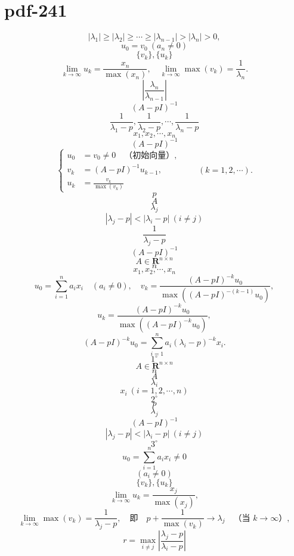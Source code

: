 \documentclass[fontset=fandol]{ctexart}
\begin{document}
\section*{pdf-241}
\[
|\lambda_1|\geq|\lambda_2|\geq\cdots\geq|\lambda_{n-1}|>|\lambda_n|>0,
\]
\[
u_0=v_0\ (a_n\ne0)
\]
\[
\{v_k\},\{u_k\}
\]
\[
\lim_{k\to\infty}u_k=\frac{x_n}{\max(x_n)},\quad\lim_{k\to\infty}\max(v_k)=\frac1{\lambda_n}.
\]
\[
\left|\dfrac{\lambda_n}{\lambda_{n-1}}\right|
\]
\[
(A-pI)^{-1}
\]
\[
\dfrac1{\lambda_1-p},\dfrac1{\lambda_2-p},\cdots,\dfrac1{\lambda_n-p}
\]
\[
x_1,x_2,\cdots,x_n
\]
\[
(A-pI)^{-1}
\]
\[
\left\{
\begin{aligned}
u_0&=v_0\ne0\quad\text{（初始向量）},\\
v_k&=(A-pI)^{-1}u_{k-1},\\
u_k&=\frac{v_k}{\max(v_k)}
\end{aligned}
\right.\qquad(k=1,2,\cdots).
\tag{9.2.12}
\]
\[
p
\]
\[
A
\]
\[
\lambda_j
\]
\[
|\lambda_j-p|<|\lambda_i-p|\ (i\ne j)
\]
\[
\dfrac1{\lambda_j-p}
\]
\[
(A-pI)^{-1}
\]
\[
A\in\mathbf R^{n\times n}
\]
\[
n
\]
\[
x_1,x_2,\cdots,x_n
\]
\[
u_0=\sum_{i=1}^na_ix_i\quad(a_i\ne0),\quad
v_k=\frac{(A-pI)^{-k}u_0}{\max((A-pI)^{-(k-1)}u_0)},
\]
\[
u_k=\frac{(A-pI)^{-k}u_0}{\max((A-pI)^{-k}u_0)},
\]
\[
(A-pI)^{-k}u_0=\sum_{i=1}^na_i(\lambda_i-p)^{-k}x_i.
\]
\[
1^\circ
\]
\[
A\in\mathbf R^{n\times n}
\]
\[
n
\]
\[
A
\]
\[
\lambda_i
\]
\[
x_i\ (i=1,2,\cdots,n)
\]
\[
2^\circ
\]
\[
p
\]
\[
\lambda_j
\]
\[
(A-pI)^{-1}
\]
\[
|\lambda_j-p|<|\lambda_i-p|\ (i\ne j)
\]
\[
3^\circ
\]
\[
u_0=\displaystyle\sum_{i=1}^na_ix_i\ne0
\]
\[
(a_i\ne0)
\]
\[
\{v_k\},\{u_k\}
\]
\[
\lim_{k\to\infty}u_k=\frac{x_j}{\max(x_j)},
\]
\[
\lim_{k\to\infty}\max(v_k)=\frac1{\lambda_j-p},\quad\text{即}\quad p+\frac1{\max(v_k)}\to\lambda_j\quad\text{（当 }k\to\infty\text{）},
\]
\[
r=\displaystyle\max_{i\ne j}\left|\dfrac{\lambda_j-p}{\lambda_i-p}\right|
\]
\end{document}
